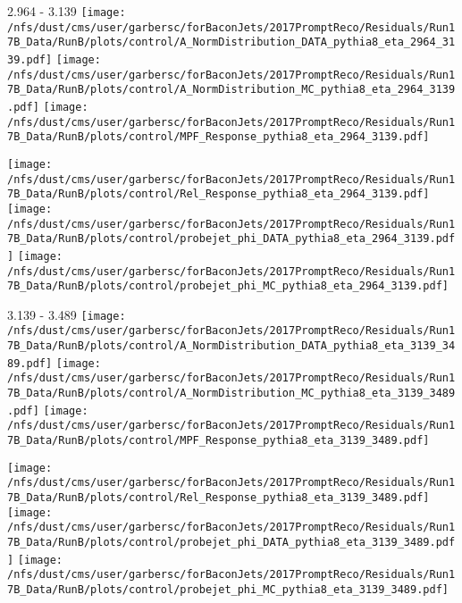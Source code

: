 \documentclass[t,compress]{beamer}
\begin{document}
\begin{frame}{2.964 - 3.139}
	\texttt{[image: /nfs/dust/cms/user/garbersc/forBaconJets/2017PromptReco/Residuals/Run17B\_Data/RunB/plots/control/A\_NormDistribution\_DATA\_pythia8\_eta\_2964\_3139.pdf]}
	\texttt{[image: /nfs/dust/cms/user/garbersc/forBaconJets/2017PromptReco/Residuals/Run17B\_Data/RunB/plots/control/A\_NormDistribution\_MC\_pythia8\_eta\_2964\_3139.pdf]}
	\texttt{[image: /nfs/dust/cms/user/garbersc/forBaconJets/2017PromptReco/Residuals/Run17B\_Data/RunB/plots/control/MPF\_Response\_pythia8\_eta\_2964\_3139.pdf]}
\newline

	\texttt{[image: /nfs/dust/cms/user/garbersc/forBaconJets/2017PromptReco/Residuals/Run17B\_Data/RunB/plots/control/Rel\_Response\_pythia8\_eta\_2964\_3139.pdf]}
	\texttt{[image: /nfs/dust/cms/user/garbersc/forBaconJets/2017PromptReco/Residuals/Run17B\_Data/RunB/plots/control/probejet\_phi\_DATA\_pythia8\_eta\_2964\_3139.pdf]}
	\texttt{[image: /nfs/dust/cms/user/garbersc/forBaconJets/2017PromptReco/Residuals/Run17B\_Data/RunB/plots/control/probejet\_phi\_MC\_pythia8\_eta\_2964\_3139.pdf]}
\end{frame}

\begin{frame}{3.139 - 3.489}
	\texttt{[image: /nfs/dust/cms/user/garbersc/forBaconJets/2017PromptReco/Residuals/Run17B\_Data/RunB/plots/control/A\_NormDistribution\_DATA\_pythia8\_eta\_3139\_3489.pdf]}
	\texttt{[image: /nfs/dust/cms/user/garbersc/forBaconJets/2017PromptReco/Residuals/Run17B\_Data/RunB/plots/control/A\_NormDistribution\_MC\_pythia8\_eta\_3139\_3489.pdf]}
	\texttt{[image: /nfs/dust/cms/user/garbersc/forBaconJets/2017PromptReco/Residuals/Run17B\_Data/RunB/plots/control/MPF\_Response\_pythia8\_eta\_3139\_3489.pdf]}
\newline

	\texttt{[image: /nfs/dust/cms/user/garbersc/forBaconJets/2017PromptReco/Residuals/Run17B\_Data/RunB/plots/control/Rel\_Response\_pythia8\_eta\_3139\_3489.pdf]}
	\texttt{[image: /nfs/dust/cms/user/garbersc/forBaconJets/2017PromptReco/Residuals/Run17B\_Data/RunB/plots/control/probejet\_phi\_DATA\_pythia8\_eta\_3139\_3489.pdf]}
	\texttt{[image: /nfs/dust/cms/user/garbersc/forBaconJets/2017PromptReco/Residuals/Run17B\_Data/RunB/plots/control/probejet\_phi\_MC\_pythia8\_eta\_3139\_3489.pdf]}
\end{frame}
\end{document}
